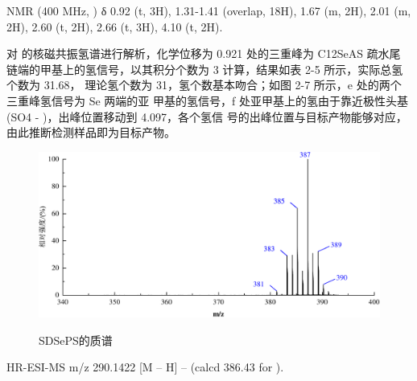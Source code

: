 \documentclass[bachelor,fandolfonts,replaceperiod]{jnuthesis} %
\begin{document}
     NMR (400 MHz, ) δ 0.92 (t, 3H), 1.31-1.41 (overlap, 18H), 1.67 (m, 2H), 2.01 (m, 2H), 2.60 (t, 2H), 
    2.66 (t, 3H),  4.10 (t, 2H).
    
    对  的核磁共振氢谱进行解析，化学位移为 0.921 处的三重峰为 C12SeAS 疏水尾
    链端的甲基上的氢信号，以其积分个数为 3 计算，结果如表 2-5 所示，实际总氢个数为 31.68，
    理论氢个数为 31，氢个数基本吻合；如图 2-7 所示，e 处的两个三重峰氢信号为 Se 两端的亚
    甲基的氢信号，f 处亚甲基上的氢由于靠近极性头基(SO4 - )，出峰位置移动到 4.097，各个氢信
    号的出峰位置与目标产物能够对应，由此推断检测样品即为目标产物。
     \begin{figure}[H]
        \centering
        \includegraphics[width=.8\textwidth]{figure/mass123.pdf}\\
        \caption{SDSePS的质谱}\label{fig:NMR-12+3}
    \end{figure}

HR-ESI-MS m/z 290.1422 [M – H] – (calcd 386.43 for ).
%
    
\end{document}
